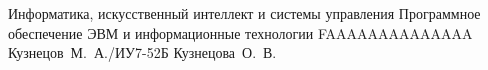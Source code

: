 \documentclass{bmstu}
\begin{document}
\makeresearchtitle
    {Информатика, искусственный интеллект и системы управления} %
    {Программное обеспечение ЭВМ и информационные технологии} %
    {FAAAAAAAAAAAAAA} %
    {Кузнецов~М.~А./ИУ7-52Б} %
    {Кузнецова~О.~В.} %
    {}



\maketableofcontents











\makebibliography


\end{document}
